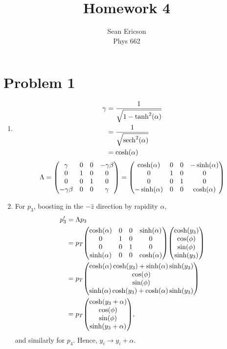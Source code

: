 \documentclass[12pt]{article}
\begin{document}
\title{Homework 4}
\author{Sean Ericson \\ Phys 662}
\maketitle

\section*{Problem 1}
\begin{enumerate}[label=(\alph*)]
    \item 
    \begin{align*}
        \gamma &= \frac{1}{\sqrt{1 - \tanh^2(\alpha)}} \\
        &= \frac{1}{\sqrt{\sech^2(\alpha)}} \\
        &= \cosh(\alpha)
    \end{align*}
    \[ \Lambda = \mqty(\gamma&0&0&-\gamma\beta\\0&1&0&0\\0&0&1&0\\-\gamma\beta&0&0&\gamma) = \mqty(\cosh(\alpha)&0&0&-\sinh(\alpha)\\0&1&0&0\\0&0&1&0\\-\sinh(\alpha)&0&0&\cosh(\alpha)) \]
    
    \item For $p_3$, boosting in the $-\hat{z}$ direction by rapidity $\alpha$, 
    \begin{align*}
        p'_3 &= \Lambda p_3 \\
        &= p_T\mqty(\cosh(\alpha)&0&0&\sinh(\alpha)\\0&1&0&0\\0&0&1&0\\\sinh(\alpha)&0&0&\cosh(\alpha))\mqty(\cosh(y_3)\\\cos(\phi)\\\sin(\phi)\\\sinh(y_3)) \\
        &= p_T \mqty(\cosh(\alpha)\cosh(y_3)+\sinh(\alpha)\sinh(y_3)\\\cos(\phi)\\\sin(\phi)\\\sinh(\alpha)\cosh(y_3) + \cosh(\alpha)\sinh(y_3)) \\
        &= p_T \mqty(\cosh(y_3+\alpha)\\\cos(\phi)\\\sin(\phi)\\\sinh(y_3+\alpha)), \\
    \end{align*}
    and similarly for $p_4$. Hence, $y_i \to y_i +  \alpha$. 
    

\end{enumerate}
\end{document}
